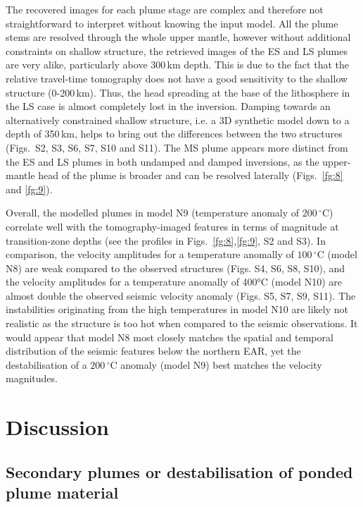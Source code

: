 \documentclass[a4paper,10pt,twocolumn]{paper}
\begin{document}
The recovered images for each plume stage are complex and therefore not straightforward to interpret without knowing the input model.
All the plume stems are resolved through the whole upper mantle, however without additional constraints on shallow structure, the retrieved images of the ES and LS plumes are very alike, particularly above 300\,km depth. This is due to the fact that the relative travel-time tomography does not have a good sensitivity to the shallow structure (0-200\,km). Thus, the head spreading at the base of the lithosphere in the LS case is almost completely lost in the inversion. Damping towards an alternatively constrained shallow structure, i.e. a 3D synthetic model down to a depth of 350\,km, helps to bring out the differences between the two structures (Figs.~S2, S3, S6, S7, S10 and S11). The MS plume appears more distinct from the ES and LS plumes in both undamped and damped inversions, as the upper-mantle head of the plume is broader and can be resolved laterally (Figs.~\ref{fg:8} and \ref{fg:9}). 

Overall, the modelled plumes in model N9 (temperature anomaly of $200\,^{\circ}$C) correlate well with the tomography-imaged features in terms of magnitude at transition-zone depths (see the profiles in Figs.~\ref{fg:8},\ref{fg:9}, S2 and S3). In comparison, the velocity amplitudes for a temperature anomally of $100\,^{\circ}$C (model N8) are weak compared to the observed structures (Figs. S4, S6, S8, S10), and the velocity amplitudes for a temperature anomally of 400°C (model N10) are almost double the observed seismic velocity anomaly (Figs. S5, S7, S9, S11). The instabilities originating from the high temperatures in model N10 are likely not realistic as the structure is too hot when compared to the seismic observations. It would appear that model N8 most closely matches the spatial and temporal distribution of the seismic features below the northern EAR, yet the destabilisation of a $200\,^{\circ}$C anomaly (model N9) best matches the velocity magnitudes.

\section{Discussion}

\subsection{Secondary plumes or destabilisation of ponded plume material}
\end{document}

